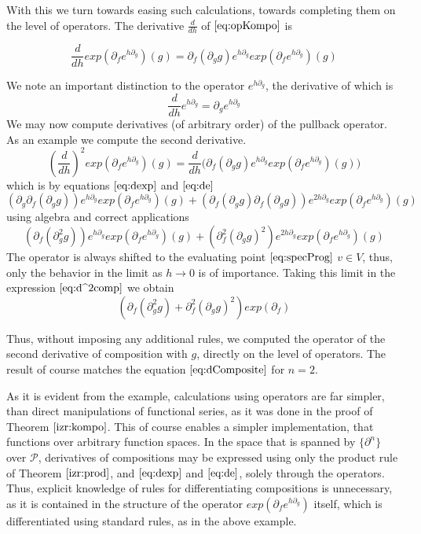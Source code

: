\documentclass{article}
\newcommand{\dP}{\mathcal{P}}
\newcommand{\D}{\partial}
\begin{document}
 With this we turn towards easing such calculations, towards completing them on the level of operators. The derivative $\frac{d}{dh}$ of $\eqref{eq:opKompo}$ is
 
 \begin{equation}\label{eq:dexp}
 \frac{d}{dh}exp(\D_fe^{h\D_g})(g)=\D_f(\D_gg)e^{h\D_g}exp(\D_fe^{h\D_g})(g)
 \end{equation}
 
 We note an important distinction to the operator $e^{h\D_g}$, the derivative of which is
 \begin{equation}\label{eq:de}
\frac{d}{dh}e^{h\D_g}=\D_ge^{h\D_g}
 \end{equation}
 We may now compute derivatives (of arbitrary order) of the pullback operator. As an example we compute the second derivative.
 $$(\frac{d}{dh})^2exp(\D_fe^{h\D_g})(g)=\frac{d}{dh}\Big(\D_f(\D_gg)e^{h\D_g}exp(\D_fe^{h\D_g})(g)\Big)$$
 which is by equations $\eqref{eq:dexp}$ and $\eqref{eq:de}$
 $$(\D_g\D_f(\D_gg))e^{h\D_g}exp(\D_fe^{h\D_g})(g)+(\D_f(\D_gg)\D_f(\D_gg))e^{2h\D_g}exp(\D_fe^{h\D_g})(g)$$
 using algebra and correct applications
 \begin{equation}\label{eq:d^2comp}
 (\D_f(\D^2_gg))e^{h\D_g}exp(\D_fe^{h\D_g})(g)+(\D^2_f(\D_gg)^2)e^{2h\D_g}exp(\D_fe^{h\D_g})(g)
 \end{equation}
 The operator is always shifted to the evaluating point $\eqref{eq:specProg}$ $v\in V$, thus, only the behavior in the limit as $h\to 0$ is of importance. Taking this limit in the expression $\eqref{eq:d^2comp}$ we obtain
 \begin{equation}
	(\D_f(\D^2_gg)+\D^2_f(\D_gg)^2)exp(\D_f)
 \end{equation}
 
 Thus, without imposing any additional rules, we computed the operator of the second derivative of composition with $g$, directly on the level of operators. The result of course matches the equation $\eqref{eq:dComposite}$ for $n=2$.
 
 As it is evident from the example, calculations using operators are far simpler, than direct manipulations of functional series, as it was done in the proof of Theorem $\ref{izr:kompo}$. This of course enables a simpler implementation, that functions over arbitrary function spaces. In the space that is spanned by $\{\D^n\}$ over $\dP$, derivatives of compositions may be expressed using only the product rule of Theorem $\ref{izr:prod}$, and $\eqref{eq:dexp}$ and $\eqref{eq:de}$, solely through the operators. Thus, explicit knowledge of rules for differentiating compositions is unnecessary, as it is contained in the structure of the operator $exp(\D_fe^{h\D_g})$ itself, which is differentiated using standard rules, as in the above example.
 
\end{document}
